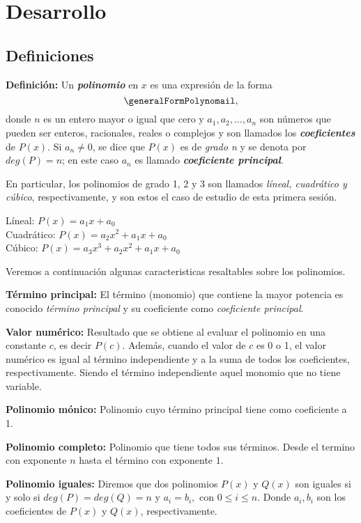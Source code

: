 \section{Desarrollo}

\subsection{Definiciones}

\textbf{Definición:} Un \textbf{\emph{polinomio}} en $x$ es una expresión de la forma \[\generalFormPolynomail,\]
donde $n$ es un entero mayor o igual que cero y $a_1, a_2, \dots, a_n$ son números que pueden ser enteros,
racionales, reales o complejos y son llamados los \textbf{\emph{coeficientes}} de $P(x)$. Si $a_n \neq 0$,
se dice que $P(x)$ es de \emph{grado n} y se denota por $deg(P) = n$; en este caso $a_n$ es llamado \textbf{\emph{coeficiente principal}}.

En particular, los polinomios de grado 1, 2 y 3 son llamados \emph{líneal, cuadrático y cúbico},
respectivamente, y son estos el caso de estudio de esta primera sesión.
\vspace{-2mm}
\begin{center}
    Líneal: $P(x) = a_{1}x+a_0$\\
    Cuadrático: $P(x) = a_2x^2+a_{1}x+a_0$\\
    Cúbico: $P(x) = a_3x^3+a_2x^2+a_{1}x+a_0$
\end{center}

Veremos a continuación algunas caracteristicas resaltables sobre los polinomios.

\textbf{Término principal:} El término (monomio) que contiene la mayor potencia es conocido \emph{término principal} y su coeficiente como \emph{coeficiente principal}.

\textbf{Valor numérico:} Resultado que se obtiene al evaluar el polinomio en una constante $c$, es decir $P(c)$. Además, cuando el valor de $c$ es 0 o 1, el valor numérico
es igual al término independiente y a la suma de todos los coeficientes, respectivamente. Siendo el término independiente aquel monomio que no tiene variable.

\textbf{Polinomio mónico:} Polinomio cuyo término principal tiene como coeficiente a 1.

\textbf{Polinomio completo:} Polinomio que tiene todos sus términos. Desde el termino con exponente $n$ hasta el término con exponente $1$.

\textbf{Polinomio iguales:} Diremos que dos polinomios $P(x)$ y $Q(x)$ son iguales si y solo si $deg(P) = deg(Q) = n$ y $a_i = b_i,$ con $0\leq i\leq n$. Donde $a_i, b_i$ son los coeficientes de $P(x)$ y $Q(x)$, respectivamente.

